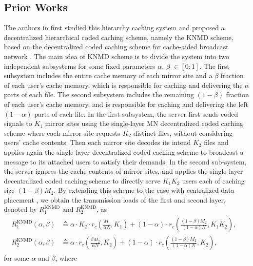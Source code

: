 \documentclass[onecolumn,10pt]{IEEEtran}
\theoremstyle{mythm}
\begin{document}
\subsection{Prior Works}
\label{subsec:prior-work}
The authors in \cite{KNMD} first studied this hierarchy   caching system and proposed a   decentralized hierarchical  coded caching scheme, namely the KNMD scheme,     based on the decentralized coded caching scheme for cache-aided broadcast network \cite{MND}.
The   main idea of KNMD scheme is to divide the system into two independent subsystems for some fixed parameters $\alpha$, $\beta$ $\in [0:1]$.  The first subsystem includes the entire cache memory of each mirror site and a $\beta$ fraction of each user's cache memory, which is responsible for caching and delivering the $\alpha$ parts of  each file.
The second subsystem includes the remaining $(1-\beta)$ fraction of each user's cache memory, and is responsible for caching and delivering the left $(1-\alpha)$ parts of each file.
In the first subsystem,  the server first sends coded signals to $K_1$ mirror sites using the single-layer MN decentralized coded caching scheme \cite{MND} where each mirror site  requests $K_2$ distinct files, without considering users'  cache contents. Then each mirror site   decodes its intend $K_2$ files and   applies again the single-layer decentralized coded caching scheme to broadcast a message to its attached users to satisfy their demands. In the second sub-system, the server  ignores the cache contents of mirror sites, and applies the   single-layer decentralized coded caching scheme to directly serve  $K_1K_2$ users each of caching size $(1-\beta) M_2$.    By extending this scheme to the case with centralized data placement \cite{MN}, we obtain     the transmission loads of the first and second layer, denoted by $R^\text{KNMD}_1$ and $R^\text{KNMD}_2$,   as
\begin{eqnarray}
\label{DHCC-B}
\begin{split}
R^\text{KNMD}_1(\alpha,\beta)&\triangleq   \alpha\cdot K_2\cdot r_c\left(\frac{M_1}{\alpha N},K_1\right)
+(1-\alpha)\cdot r_c\left(\frac{(1-\beta)M_2}{(1-\alpha)N},K_1K_2 \right),&\\
R^\text{KNMD}_2(\alpha,\beta)&\triangleq  \alpha\cdot r_c\left(\frac{\beta M_2}{\alpha N},K_2\right)
+(1-\alpha)\cdot r_c\left(\frac{(1-\beta)M_2}{(1-\alpha)N},K_2 \right),
\end{split}
\end{eqnarray} for some $\alpha$ and $\beta$, where
\end{document}
